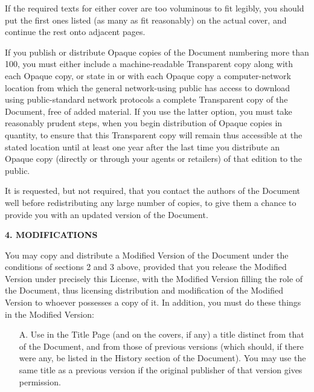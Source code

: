 \documentclass[10pt,a4paper,ngerman,titlepage,tocindentauto]{article}
\begin{document}
\begin{multicols}{3}
{					If the required texts for either cover are too voluminous to fit
					legibly, you should put the first ones listed (as many as fit
					reasonably) on the actual cover, and continue the rest onto adjacent
					pages.

					If you publish or distribute Opaque copies of the Document numbering
					more than 100, you must either include a machine-readable Transparent
					copy along with each Opaque copy, or state in or with each Opaque copy
					a computer-network location from which the general network-using
					public has access to download using public-standard network protocols
					a complete Transparent copy of the Document, free of added material.
					If you use the latter option, you must take reasonably prudent steps,
					when you begin distribution of Opaque copies in quantity, to ensure
					that this Transparent copy will remain thus accessible at the stated
					location until at least one year after the last time you distribute an
					Opaque copy (directly or through your agents or retailers) of that
					edition to the public.

					It is requested, but not required, that you contact the authors of the
					Document well before redistributing any large number of copies, to give
					them a chance to provide you with an updated version of the Document.


					\begin{center}
					{\bf 4. MODIFICATIONS\par}
					\end{center}

					You may copy and distribute a Modified Version of the Document under
					the conditions of sections 2 and 3 above, provided that you release
					the Modified Version under precisely this License, with the Modified
					Version filling the role of the Document, thus licensing distribution
					and modification of the Modified Version to whoever possesses a copy
					of it.  In addition, you must do these things in the Modified Version:

					\begin{itemize}
					\item[A.] 
						Use in the Title Page (and on the covers, if any) a title distinct
						from that of the Document, and from those of previous versions
						(which should, if there were any, be listed in the History section
						of the Document).  You may use the same title as a previous version
						if the original publisher of that version gives permission.
						

\end{itemize}}
\end{multicols}
\end{document}
